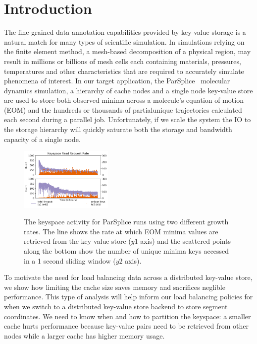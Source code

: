 \section{Introduction}
\label{sec:introduction}

The fine-grained data annotation capabilities provided by key-value storage is
a natural match for many types of scientific simulation. In simulations relying
on the finite element method, a mesh-based decomposition of a physical region,
may result in millions or billions of mesh cells each containing materials,
pressures, temperatures and other characteristics that are required to
accurately simulate phenomena of interest. In our target application, the
ParSplice~\cite{perez:jctc20150parsplice} molecular dynamics simulation, a
hierarchy of cache nodes and a single node key-value store are used to store
both observed minima across a molecule's equation of motion (EOM) and the
hundreds or thousands of partialunique trajectories calculated each second during a
parallel job. Unfortunately, if we scale the system the IO to the storage
hierarchy will quickly saturate both the storage and bandwidth capacity of a
single node. 

\begin{figure}[t]
  \noindent\includegraphics[width=0.4\textwidth]{figures/motivation-regimes.png}\\
  \caption{The keyspace activity for ParSplice runs using two different growth
  rates.  The line shows the rate at which EOM minima values are retrieved
  from the key-value store (\(y1\) axis) and the scattered points along the
  bottom show the number of unique minima keys accessed in a 1 second sliding
  window (\(y2\) axis).  \label{fig:motivation-regimes}}
\end{figure}


To motivate the need for load balancing data across a distributed key-value store,
we show how limiting the cache size saves memory and sacrifices neglible
performance. This type of analysis will help inform our load balancing policies
for when we switch to a distributed key-value store backend to store segment
coordinates.  We need to know when and how to partition the keyspace: a smaller
cache hurts performance because key-value pairs need to be retrieved from other
nodes while a larger cache has higher memory usage. 

